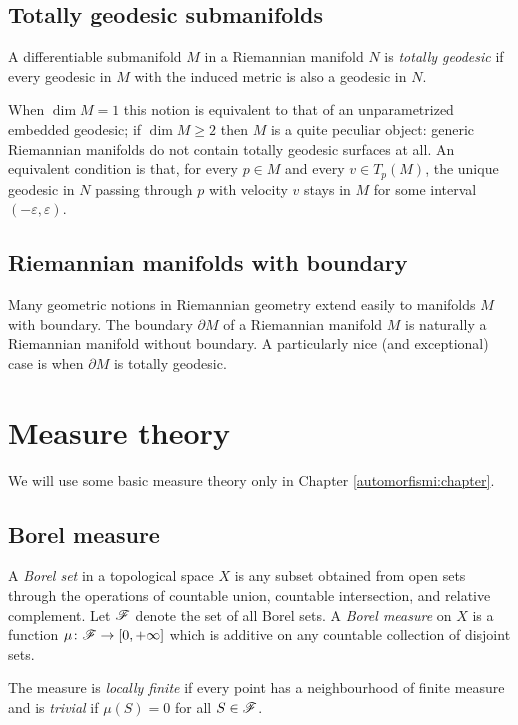 \subsection{Totally geodesic submanifolds}
A differentiable submanifold $M$ in a Riemannian manifold $N$ is \emph{totally geodesic} if 
every geodesic in $M$ with the induced metric is also a geodesic in $N$. 

When $\dim M=1$ this notion is equivalent to that of an unparametrized embedded geodesic; if $\dim M\geqslant 2$ then $M$ is a quite peculiar object: generic Riemannian manifolds do not contain totally geodesic surfaces at all. An equivalent condition is that, for every $p\in M$ and every $v \in T_p(M)$, the unique geodesic in $N$ passing through $p$ with velocity $v$ stays in $M$ for some interval $(-\varepsilon, \varepsilon)$.

\subsection{Riemannian manifolds with boundary}
Many geometric notions in Riemannian geometry extend easily to manifolds $M$ with boundary. The boundary $\partial M$ of a Riemannian manifold $M$ is naturally a Riemannian manifold without boundary. 
A particularly nice (and exceptional) case is when $\partial M$ is totally geodesic. 

\section{Measure theory} \label{measure:theory:section}
We will use some basic measure theory only in Chapter \ref{automorfismi:chapter}.

\subsection{Borel measure}
A \emph{Borel set} in a topological space $X$ is any subset obtained from open sets through the operations of countable union, countable intersection, and relative complement. Let $\mathscr{F}$ denote the set of all Borel sets.
A \emph{Borel measure} on $X$ is a function $\mu\colon \mathscr{F} \to [0,+\infty]$ which is additive on any countable collection of disjoint sets. 

The measure is \emph{locally finite} if every point has a neighbourhood of finite measure and is \emph{trivial} if $\mu(S)=0$ for all $S\in\mathscr{F}$. 

